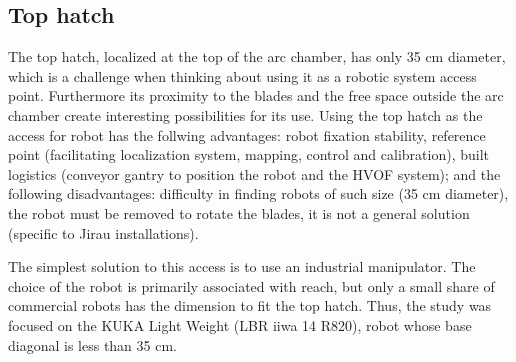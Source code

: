 \subsection{Top hatch}
The top hatch, localized at the top of the arc chamber, has only 35 cm diameter,
which is a challenge when thinking about using it as a robotic system access
point. Furthermore its proximity to the blades and the free space outside the
arc chamber create interesting possibilities for its use. Using the top hatch as
the access for robot has the follwing advantages: robot fixation stability,
reference point (facilitating localization system, mapping, control and
calibration), built logistics (conveyor gantry to position the robot and the
HVOF system); and the following disadvantages: difficulty in finding robots of
such size (35 cm diameter), the robot must be removed to rotate the blades, it
is not a general solution (specific to Jirau installations).



The simplest solution to this access is to use an industrial manipulator.
The choice of the robot is primarily associated with reach, but only a small
share of commercial robots has the dimension to fit the top hatch. Thus, the
study was focused on the KUKA Light Weight (LBR iiwa 14 R820), robot whose base
diagonal is less than 35 cm.

